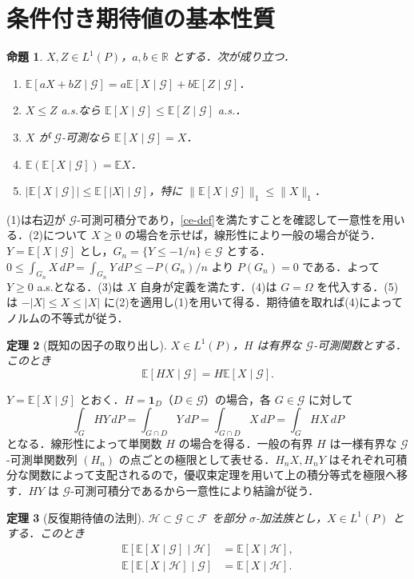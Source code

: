 \documentclass[a5paper,10pt,onecolumn]{jsarticle}
\makeatletter
\theoremstyle{mathnotetheorem}
\newtheorem{theorem}{定理}[section]
\newtheorem{proposition}[theorem]{命題}
\renewcommand{\proofname}{証明}
\renewenvironment{proof}[1][\proofname]{%
  \par\pushQED{\qed}\normalfont\topsep4\p@\@plus2\p@\relax
  \trivlist\item[\hskip\labelsep\bfseries #1]\ignorespaces
}{\popQED\endtrivlist\@endpefalse}
\newcommand{\R}{\mathbb{R}}
\newcommand{\norm}[1]{\lVert #1\rVert}
\newcommand{\F}{\mathcal F}
\newcommand{\G}{\mathcal G}
\newcommand{\E}{\mathbb E}
\newcommand{\1}{\mathbf{1}}
\makeatother
\begin{document}
\section{条件付き期待値の基本性質}
\begin{proposition}\label{basic}
$X,Z\in L^1(P)$，$a,b\in\R$ とする．次が成り立つ．
\begin{enumerate}
\item $\E[aX+bZ\mid\G]=a\E[X\mid\G]+b\E[Z\mid\G]$．
\item $X\le Z$ a.s.なら $\E[X\mid\G]\le\E[Z\mid\G]$ a.s.．
\item $X$ が $\G$-可測なら $\E[X\mid\G]=X$．
\item $\E(\E[X\mid\G])=\E X$．
\item $|\E[X\mid\G]|\le\E[|X|\mid\G]$，特に $\norm{\E[X\mid\G]}_1\le\norm X_1$．
\end{enumerate}
\end{proposition}
\begin{proof}
(1)は右辺が $\G$-可測可積分であり，\eqref{ce-def}を満たすことを確認して一意性を用いる．(2)について $X\ge0$ の場合を示せば，線形性により一般の場合が従う．$Y=\E[X\mid\G]$ とし，$G_n=\{Y\le-1/n\}\in\G$ とする．$0\le\int_{G_n} X\,dP=\int_{G_n}Y\,dP\le-P(G_n)/n$ より $P(G_n)=0$ である．よって $Y\ge0$ a.s.となる．(3)は $X$ 自身が定義を満たす．(4)は $G=\Omega$ を代入する．(5)は $-|X|\le X\le|X|$ に(2)を適用し(1)を用いて得る．期待値を取れば(4)によってノルムの不等式が従う．
\end{proof}
\begin{theorem}[既知の因子の取り出し]\label{pull}
$X\in L^1(P)$，$H$ は有界な $\G$-可測関数とする．このとき
\[
 \E[HX\mid\G]=H\E[X\mid\G].
\]
\end{theorem}
\begin{proof}
$Y=\E[X\mid\G]$ とおく．$H=\1_D$（$D\in\G$）の場合，各 $G\in\G$ に対して
\[
 \int_G HY\,dP=\int_{G\cap D}Y\,dP
 =\int_{G\cap D}X\,dP=\int_G HX\,dP
\]
となる．線形性によって単関数 $H$ の場合を得る．一般の有界 $H$ は一様有界な $\G$-可測単関数列 $(H_n)$ の点ごとの極限として表せる．$H_nX,H_nY$ はそれぞれ可積分な関数によって支配されるので，優収束定理を用いて上の積分等式を極限へ移す．$HY$ は $\G$-可測可積分であるから一意性により結論が従う．
\end{proof}
\begin{theorem}[反復期待値の法則]\label{tower}
$\mathcal H\subset\G\subset\F$ を部分 $\sigma$-加法族とし，$X\in L^1(P)$ とする．このとき
\begin{align*}
 \E[\E[X\mid\G]\mid\mathcal H]&=\E[X\mid\mathcal H],\\
 \E[\E[X\mid\mathcal H]\mid\G]&=\E[X\mid\mathcal H].
\end{align*}
\end{theorem}
\end{document}
